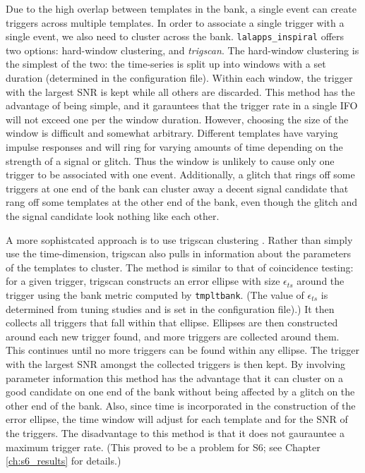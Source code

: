 Due to the high overlap between templates in the bank, a single event can create triggers across multiple templates. In order to associate a single trigger with a single event, we also need to cluster across the bank. \texttt{lalapps\_inspiral} offers two options: hard-window clustering, and \emph{trigscan}. The hard-window clustering is the simplest of the two: the time-series is split up into windows with a set duration (determined in the configuration file). Within each window, the trigger with the largest \ac{SNR} is kept while all others are discarded. This method has the advantage of being simple, and it garauntees that the trigger rate in a single \ac{IFO} will not exceed one per the window duration. However, choosing the size of the window is difficult and somewhat arbitrary. Different templates have varying impulse responses and will ring for varying amounts of time depending on the strength of a signal or glitch. Thus the window is unlikely to cause only one trigger to be associated with one event. Additionally, a glitch that rings off some triggers at one end of the bank can cluster away a decent signal candidate that rang off some templates at the other end of the bank, even though the glitch and the signal candidate look nothing like each other.

A more sophistcated approach is to use trigscan clustering \cite{ref:Keppel}. Rather than simply use the time-dimension, trigscan also pulls in information about the parameters of the templates to cluster. The method is similar to that of coincidence testing: for a given trigger, trigscan constructs an error ellipse with size $\epsilon_{ts}$ around the trigger using the bank metric computed by \texttt{tmpltbank}. (The value of $\epsilon_{ts}$ is determined from tuning studies and is set in the configuration file).) It then collects all triggers that fall within that ellipse. Ellipses are then constructed around each new trigger found, and more triggers are collected around them. This continues until no more triggers can be found within any ellipse. The trigger with the largest \ac{SNR} amongst the collected triggers is then kept. By involving parameter information this method has the advantage that it can cluster on a good candidate on one end of the bank without being affected by a glitch on the other end of the bank. Also, since time is incorporated in the construction of the error ellipse, the time window will adjust for each template and for the \ac{SNR} of the triggers. The disadvantage to this method is that it does not gaurauntee a maximum trigger rate. (This proved to be a problem for \ac{S6}; see Chapter \ref{ch:s6_results} for details.)

